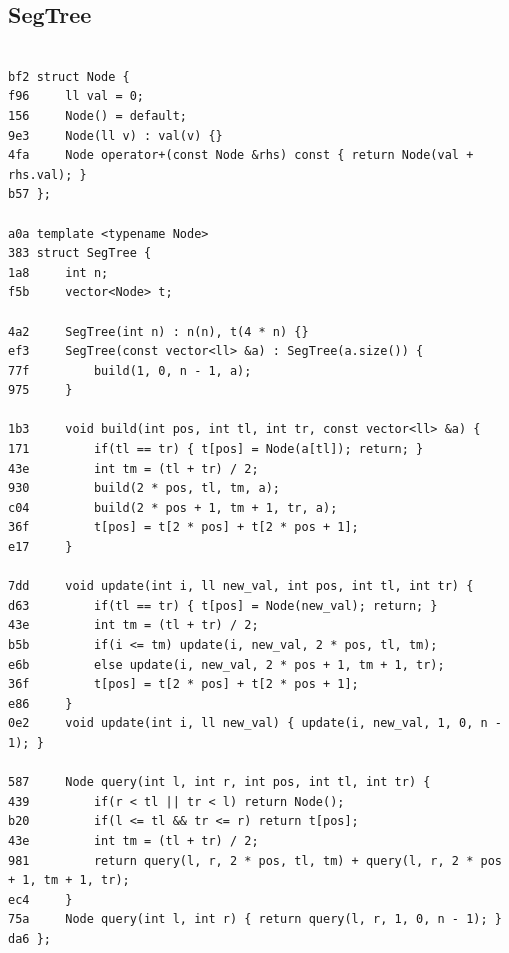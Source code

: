 \documentclass[11pt, a4paper, twoside]{article}
\begin{document}
\subsection{SegTree}
\begin{lstlisting}

bf2 struct Node {
f96     ll val = 0;
156     Node() = default;
9e3     Node(ll v) : val(v) {}
4fa     Node operator+(const Node &rhs) const { return Node(val + rhs.val); }
b57 };

a0a template <typename Node>
383 struct SegTree {
1a8     int n;
f5b     vector<Node> t;
        
4a2     SegTree(int n) : n(n), t(4 * n) {}
ef3     SegTree(const vector<ll> &a) : SegTree(a.size()) {
77f         build(1, 0, n - 1, a);
975     }
    
1b3     void build(int pos, int tl, int tr, const vector<ll> &a) {
171         if(tl == tr) { t[pos] = Node(a[tl]); return; }
43e         int tm = (tl + tr) / 2;
930         build(2 * pos, tl, tm, a);
c04         build(2 * pos + 1, tm + 1, tr, a);
36f         t[pos] = t[2 * pos] + t[2 * pos + 1];
e17     }
    
7dd     void update(int i, ll new_val, int pos, int tl, int tr) {
d63         if(tl == tr) { t[pos] = Node(new_val); return; }
43e         int tm = (tl + tr) / 2;
b5b         if(i <= tm) update(i, new_val, 2 * pos, tl, tm);
e6b         else update(i, new_val, 2 * pos + 1, tm + 1, tr);
36f         t[pos] = t[2 * pos] + t[2 * pos + 1];
e86     }
0e2     void update(int i, ll new_val) { update(i, new_val, 1, 0, n - 1); }
    
587     Node query(int l, int r, int pos, int tl, int tr) {
439         if(r < tl || tr < l) return Node();
b20         if(l <= tl && tr <= r) return t[pos];
43e         int tm = (tl + tr) / 2;
981         return query(l, r, 2 * pos, tl, tm) + query(l, r, 2 * pos + 1, tm + 1, tr);
ec4     }
75a     Node query(int l, int r) { return query(l, r, 1, 0, n - 1); }
da6 };
\end{lstlisting}
\end{document}
